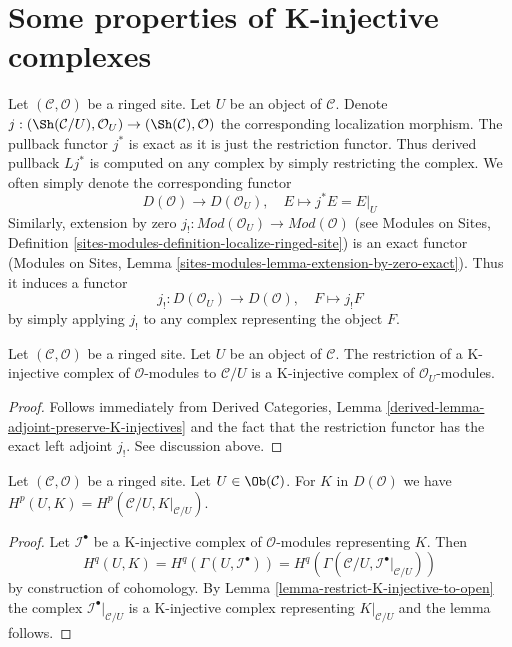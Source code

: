 \section{Some properties of K-injective complexes}
\label{section-properties-K-injective}

\noindent
Let $(\mathcal{C}, \mathcal{O})$ be a ringed site. Let $U$ be an
object of $\mathcal{C}$. Denote
$j : (\Sh(\mathcal{C}/U), \mathcal{O}_U) \to (\Sh(\mathcal{C}), \mathcal{O})$
the corresponding localization morphism. The pullback functor $j^*$ is exact
as it is just the restriction functor. Thus derived pullback $Lj^*$ is
computed on any complex by simply restricting the complex. We often
simply denote the corresponding functor
$$
D(\mathcal{O}) \to D(\mathcal{O}_U),
\quad
E \mapsto j^*E = E|_U
$$
Similarly, extension by zero
$j_! : \textit{Mod}(\mathcal{O}_U) \to \textit{Mod}(\mathcal{O})$ (see
Modules on Sites, Definition
\ref{sites-modules-definition-localize-ringed-site})
is an exact functor
(Modules on Sites, Lemma \ref{sites-modules-lemma-extension-by-zero-exact}).
Thus it induces a functor
$$
j_! : D(\mathcal{O}_U) \to D(\mathcal{O}), \quad
F \mapsto j_!F
$$
by simply applying $j_!$ to any complex representing the object $F$.

\begin{lemma}
\label{lemma-restrict-K-injective-to-open}
Let $(\mathcal{C}, \mathcal{O})$ be a ringed site. Let $U$ be an object of
$\mathcal{C}$. The restriction of a K-injective complex of
$\mathcal{O}$-modules to $\mathcal{C}/U$ is a K-injective complex of
$\mathcal{O}_U$-modules.
\end{lemma}

\begin{proof}
Follows immediately from
Derived Categories, Lemma \ref{derived-lemma-adjoint-preserve-K-injectives}
and the fact that the restriction functor has the
exact left adjoint $j_!$. See discussion above.
\end{proof}

\begin{lemma}
\label{lemma-unbounded-cohomology-of-open}
Let $(\mathcal{C}, \mathcal{O})$ be a ringed site. Let $U \in \Ob(\mathcal{C})$.
For $K$ in $D(\mathcal{O})$ we have
$H^p(U, K) = H^p(\mathcal{C}/U, K|_{\mathcal{C}/U})$.
\end{lemma}

\begin{proof}
Let $\mathcal{I}^\bullet$ be a K-injective complex of $\mathcal{O}$-modules
representing $K$. Then
$$
H^q(U, K) = H^q(\Gamma(U, \mathcal{I}^\bullet)) =
H^q(\Gamma(\mathcal{C}/U, \mathcal{I}^\bullet|_{\mathcal{C}/U}))
$$
by construction of cohomology. By
Lemma \ref{lemma-restrict-K-injective-to-open}
the complex $\mathcal{I}^\bullet|_{\mathcal{C}/U}$ is a K-injective complex
representing $K|_{\mathcal{C}/U}$ and the lemma follows.
\end{proof}

